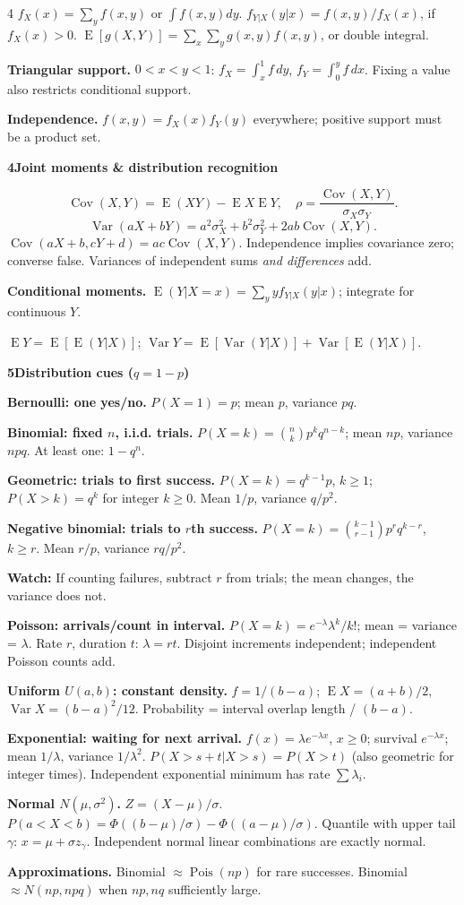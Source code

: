\documentclass[a4paper,landscape]{article}
\newcommand{\head}[2][late]{\par\vspace{3pt}\noindent\colorbox{#1}{\parbox{\dimexpr\linewidth-6pt}{\color{white}\bfseries #2}}\par\vspace{1pt}}
\newcommand{\cue}[1]{\par\textbf{#1}\enspace}
\newcommand{\trap}[1]{\par{\color{alert}\textbf{Watch:} #1}}
\newcommand{\E}{\operatorname{E}}
\newcommand{\V}{\operatorname{Var}}
\newcommand{\Cov}{\operatorname{Cov}}
\newcommand{\col}{\par\vfill\columnbreak}
\begin{document}
\begin{multicols*}{4}
\(f_X(x)=\sum_y f(x,y)\) or \(\int f(x,y)dy\).
\(f_{Y|X}(y|x)=f(x,y)/f_X(x)\), if \(f_X(x)>0\).
\(\E[g(X,Y)]=\sum_x\sum_y g(x,y)f(x,y)\), or double integral.
\cue{Triangular support.} \(0<x<y<1\): \(f_X=\int_x^1f\,dy\), \(f_Y=\int_0^yf\,dx\). Fixing a value also restricts conditional support.
\cue{Independence.} \(f(x,y)=f_X(x)f_Y(y)\) everywhere; positive support must be a product set.
\col
\head[early]{4\quad Joint moments \& distribution recognition}
\[\Cov(X,Y)=\E(XY)-\E X\E Y,\quad
 \rho=\frac{\Cov(X,Y)}{\sigma_X\sigma_Y}.\]
\[\V(aX+bY)=a^2\sigma_X^2+b^2\sigma_Y^2+2ab\Cov(X,Y).\]
\(\Cov(aX+b,cY+d)=ac\Cov(X,Y)\). Independence implies covariance zero; converse false. Variances of independent sums \emph{and differences} add.
\cue{Conditional moments.} \(\E(Y|X=x)=\sum_y y f_{Y|X}(y|x)\); integrate for continuous \(Y\).\par
\(\E Y=\E[\E(Y|X)]\); \(\V Y=\E[\V(Y|X)]+\V[\E(Y|X)]\).
\head[early]{5\quad Distribution cues \quad (\(q=1-p\))}
\cue{Bernoulli: one yes/no.} \(P(X=1)=p\); mean \(p\), variance \(pq\).
\cue{Binomial: fixed \(n\), i.i.d. trials.}
\(P(X=k)={n\choose k}p^kq^{n-k}\); mean \(np\), variance \(npq\). At least one: \(1-q^n\).
\cue{Geometric: trials to first success.}
\(P(X=k)=q^{k-1}p\), \(k\ge1\); \(P(X>k)=q^k\) for integer \(k\ge0\). Mean \(1/p\), variance \(q/p^2\).
\cue{Negative binomial: trials to \(r\)th success.}
\(P(X=k)={k-1\choose r-1}p^rq^{k-r}\), \(k\ge r\). Mean \(r/p\), variance \(rq/p^2\).
\trap{If counting failures, subtract \(r\) from trials; the mean changes, the variance does not.}
\cue{Poisson: arrivals/count in interval.}
\(P(X=k)=e^{-\lambda}\lambda^k/k!\); mean = variance = \(\lambda\). Rate \(r\), duration \(t\): \(\lambda=rt\). Disjoint increments independent; independent Poisson counts add.
\cue{Uniform \(U(a,b)\): constant density.}
\(f=1/(b-a)\); \(\E X=(a+b)/2\), \(\V X=(b-a)^2/12\). Probability = interval overlap length / \((b-a)\).
\cue{Exponential: waiting for next arrival.}
\(f(x)=\lambda e^{-\lambda x}\), \(x\ge0\); survival \(e^{-\lambda x}\); mean \(1/\lambda\), variance \(1/\lambda^2\).
\(P(X>s+t|X>s)=P(X>t)\) (also geometric for integer times). Independent exponential minimum has rate \(\sum\lambda_i\).
\cue{Normal \(N(\mu,\sigma^2)\).} \(Z=(X-\mu)/\sigma\).
\(P(a<X<b)=\Phi((b-\mu)/\sigma)-\Phi((a-\mu)/\sigma)\).
Quantile with upper tail \(\gamma\): \(x=\mu+\sigma z_\gamma\). Independent normal linear combinations are exactly normal.
\cue{Approximations.} Binomial \(\approx\operatorname{Pois}(np)\) for rare successes. Binomial \(\approx N(np,npq)\) when \(np,nq\) sufficiently large.

\end{multicols*}
\end{document}

